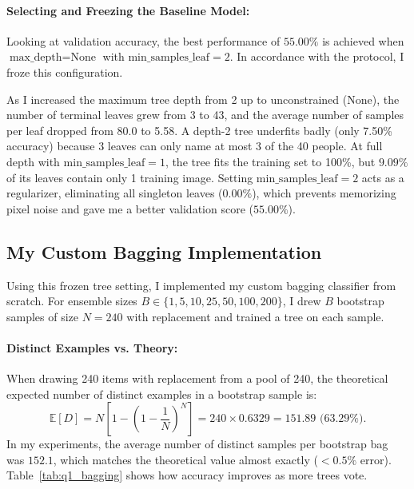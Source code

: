 \documentclass[10pt,twocolumn,letterpaper]{article}
\begin{document}
\paragraph{Selecting and Freezing the Baseline Model:}
Looking at validation accuracy, the best performance of $55.00\%$ is achieved when $\text{max\_depth}=\text{None}$ with $\text{min\_samples\_leaf}=2$. In accordance with the protocol, I froze this configuration. 

As I increased the maximum tree depth from 2 up to unconstrained ($\text{None}$), the number of terminal leaves grew from 3 to 43, and the average number of samples per leaf dropped from 80.0 to 5.58. A depth-2 tree underfits badly (only 7.50\% accuracy) because 3 leaves can only name at most 3 of the 40 people. At full depth with $\text{min\_samples\_leaf}=1$, the tree fits the training set to 100\%, but $9.09\%$ of its leaves contain only 1 training image. Setting $\text{min\_samples\_leaf}=2$ acts as a regularizer, eliminating all singleton leaves ($0.00\%$), which prevents memorizing pixel noise and gave me a better validation score ($55.00\%$).

\subsection{My Custom Bagging Implementation}
Using this frozen tree setting, I implemented my custom bagging classifier from scratch. For ensemble sizes $B \in \{1, 5, 10, 25, 50, 100, 200\}$, I drew $B$ bootstrap samples of size $N=240$ with replacement and trained a tree on each sample.

\paragraph{Distinct Examples vs. Theory:}
When drawing 240 items with replacement from a pool of 240, the theoretical expected number of distinct examples in a bootstrap sample is:
\begin{equation}
    \mathbb{E}[D] = N \left[1 - \left(1 - \frac{1}{N}\right)^N\right] = 240 \times 0.6329 = 151.89 \text{ (63.29\%)}.
\end{equation}
In my experiments, the average number of distinct samples per bootstrap bag was $152.1$, which matches the theoretical value almost exactly ($< 0.5\%$ error). Table~\ref{tab:q1_bagging} shows how accuracy improves as more trees vote.
\end{document}
